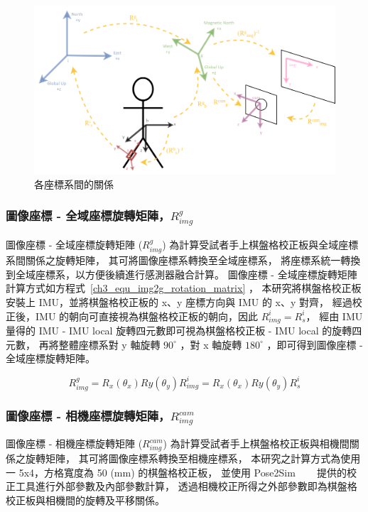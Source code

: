 \begin{figure}[!ht]
   \centering
   \includegraphics[width=\textwidth]{figure/ch3_fig_coordinate_trans.png}
    \caption[各座標系間的關係]{各座標系間的關係}
    \label{ch3_fig_coordinate_trans}
\end{figure}

\subsubsection{圖像座標 - 全域座標旋轉矩陣，$R^{g}_{img}$}
圖像座標 - 全域座標旋轉矩陣 ($R^{g}_{img}$) 為計算受試者手上棋盤格校正板與全域座標系間關係之旋轉矩陣，
其可將圖像座標系轉換至全域座標系，
將座標系統一轉換到全域座標系，以方便後續進行感測器融合計算。
圖像座標 - 全域座標旋轉矩陣計算方式如方程式~\ref{ch3_equ_img2g_rotation_matrix} ，
本研究將棋盤格校正板安裝上 IMU，並將棋盤格校正板的 x、y 座標方向與 IMU 的 x、y 對齊，
經過校正後，IMU 的朝向可直接視為棋盤格校正板的朝向，因此 $R^{i}_{img} = R^{i}_{s}$，
經由 IMU 量得的 IMU - IMU local 旋轉四元數即可視為棋盤格校正板 - IMU local 的旋轉四元數，
再將整體座標系對 y 軸旋轉 $90^{\circ}$ ，對 x 軸旋轉 $180^{\circ}$ ，即可得到圖像座標 - 全域座標旋轉矩陣。

\begin{equation}
   R^{g}_{img} = R_{x}(\theta_{x})R{y}(\theta_{y})R^{i}_{img} = R_{x}(\theta_{x})R{y}(\theta_{y})R^{i}_{s}
   \label{ch3_equ_img2g_rotation_matrix}
\end{equation}

\subsubsection{圖像座標 - 相機座標旋轉矩陣，$R^{cam}_{img}$}
圖像座標 - 相機座標旋轉矩陣 ($R^{cam}_{img}$) 為計算受試者手上棋盤格校正板與相機間關係之旋轉矩陣，
其可將圖像座標系轉換至相機座標系，
本研究之計算方式為使用一 5x4，方格寬度為 50 (mm) 的棋盤格校正板，
並使用 Pose2Sim ~\cite{Pagnon_2022_JOSS}~\cite{Pagnon_2021_Robustness}~\cite{Pagnon_2022_Accuracy} 提供的校正工具進行外部參數及內部參數計算，
透過相機校正所得之外部參數即為棋盤格校正板與相機間的旋轉及平移關係。

